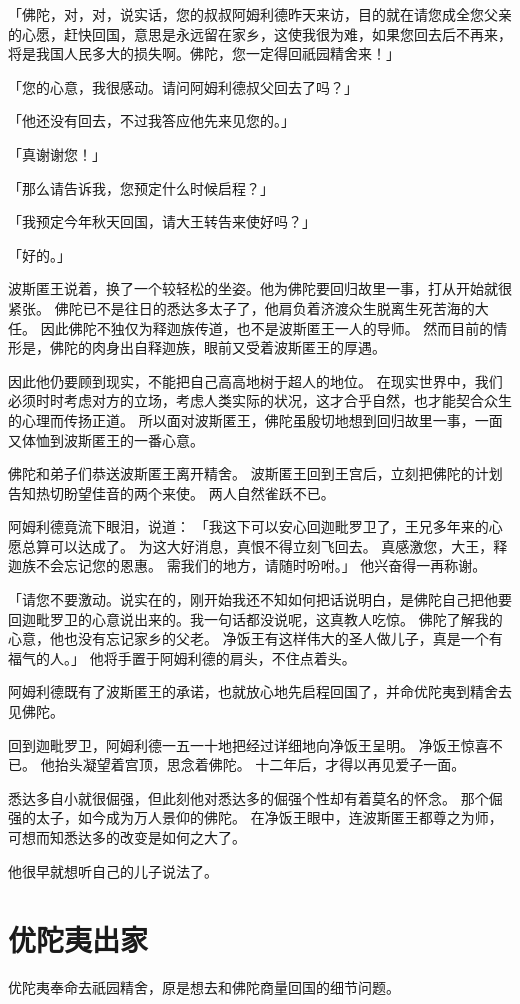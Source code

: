 \documentclass[twoside,openany]{book}
\begin{document}
「佛陀，对，对，说实话，您的叔叔阿姆利德昨天来访，目的就在请您成全您父亲的心愿，赶快回国，意思是永远留在家乡，这使我很为难，如果您回去后不再来，将是我国人民多大的损失啊。佛陀，您一定得回祇园精舍来！」

「您的心意，我很感动。请问阿姆利德叔父回去了吗？」

「他还没有回去，不过我答应他先来见您的。」

「真谢谢您！」

「那么请告诉我，您预定什么时候启程？」

「我预定今年秋天回国，请大王转告来使好吗？」

「好的。」

波斯匿王说着，换了一个较轻松的坐姿。他为佛陀要回归故里一事，打从开始就很紧张。
佛陀已不是往日的悉达多太子了，他肩负着济渡众生脱离生死苦海的大任。
因此佛陀不独仅为释迦族传道，也不是波斯匿王一人的导师。
然而目前的情形是，佛陀的肉身出自释迦族，眼前又受着波斯匿王的厚遇。

因此他仍要顾到现实，不能把自己高高地树于超人的地位。
在现实世界中，我们必须时时考虑对方的立场，考虑人类实际的状况，这才合乎自然，也才能契合众生的心理而传扬正道。
所以面对波斯匿王，佛陀虽殷切地想到回归故里一事，一面又体恤到波斯匿王的一番心意。

佛陀和弟子们恭送波斯匿王离开精舍。
波斯匿王回到王宫后，立刻把佛陀的计划告知热切盼望佳音的两个来使。
两人自然雀跃不已。

阿姆利德竟流下眼泪，说道：
「我这下可以安心回迦毗罗卫了，王兄多年来的心愿总算可以达成了。
为这大好消息，真恨不得立刻飞回去。
真感激您，大王，释迦族不会忘记您的恩惠。
需我们的地方，请随时吩咐。」
他兴奋得一再称谢。

「请您不要激动。说实在的，刚开始我还不知如何把话说明白，是佛陀自己把他要回迦毗罗卫的心意说出来的。我一句话都没说呢，这真教人吃惊。
佛陀了解我的心意，他也没有忘记家乡的父老。
净饭王有这样伟大的圣人做儿子，真是一个有福气的人。」
他将手置于阿姆利德的肩头，不住点着头。

阿姆利德既有了波斯匿王的承诺，也就放心地先启程回国了，并命优陀夷到精舍去见佛陀。

回到迦毗罗卫，阿姆利德一五一十地把经过详细地向净饭王呈明。
净饭王惊喜不已。
他抬头凝望着宫顶，思念着佛陀。
十二年后，才得以再见爱子一面。

悉达多自小就很倔强，但此刻他对悉达多的倔强个性却有着莫名的怀念。
那个倔强的太子，如今成为万人景仰的佛陀。
在净饭王眼中，连波斯匿王都尊之为师，可想而知悉达多的改变是如何之大了。

他很早就想听自己的儿子说法了。

\section{优陀夷出家}\label{sec7.4}
优陀夷奉命去祇园精舍，原是想去和佛陀商量回国的细节问题。
\end{document}
